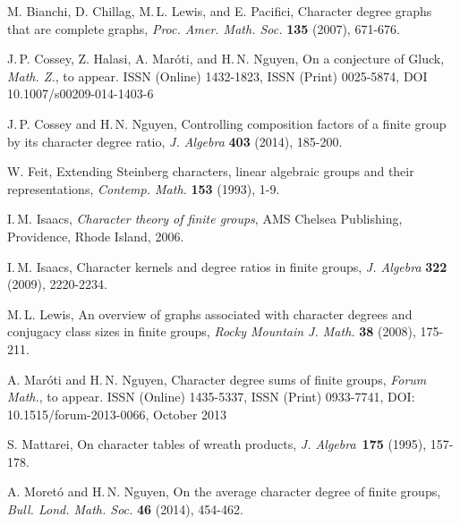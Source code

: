 \documentclass[12pt]{amsart}
\theoremstyle{definition}
\theoremstyle{remark}
\begin{document}
\begin{thebibliography}{13}

M. Bianchi, D. Chillag, M.\,L. Lewis, and E. Pacifici, Character
degree graphs that are complete graphs, {\it Proc. Amer. Math. Soc.}
{\bf135} (2007), 671-676.

J.\,P. Cossey, Z. Halasi, A. Mar\'{o}ti, and H.\,N. Nguyen, On a
conjecture of Gluck, \emph{Math. Z.}, to appear. ISSN (Online)
1432-1823, ISSN (Print) 0025-5874, DOI 10.1007/s00209-014-1403-6

J.\,P. Cossey and H.\,N. Nguyen, Controlling composition factors of
a finite group by its character degree ratio, \emph{J. Algebra}
\textbf{403} (2014), 185-200.

W. Feit, Extending Steinberg characters, linear algebraic groups and
their representations, {\it Contemp. Math.} {\bf 153} (1993), 1-9.

  I.\,M. Isaacs, {\it Character theory of finite groups}, AMS Chelsea
Publishing, Providence, Rhode Island, 2006.

I.\,M. Isaacs, Character kernels and degree ratios in finite groups,
{\it J. Algebra} {\bf322} (2009), 2220-2234.

 M.\,L. Lewis, An overview of graphs associated with character degrees and conjugacy
 class sizes in finite groups, \emph{Rocky Mountain J. Math.} \textbf{38} (2008), 175-211.

A. Mar\'{o}ti and H.\,N. Nguyen, Character degree sums of finite
groups, \emph{Forum Math.}, to appear. ISSN (Online) 1435-5337, ISSN
(Print) 0933-7741, DOI: 10.1515/forum-2013-0066, October 2013

S. Mattarei, On character tables of wreath products, \emph{J.
Algebra}~\textbf{175} (1995), 157-178.

A. Moret\'{o} and H.\,N. Nguyen, On the average character degree of
finite groups, \emph{Bull. Lond. Math. Soc.} \textbf{46} (2014),
454-462.

\end{thebibliography}
\end{document}
